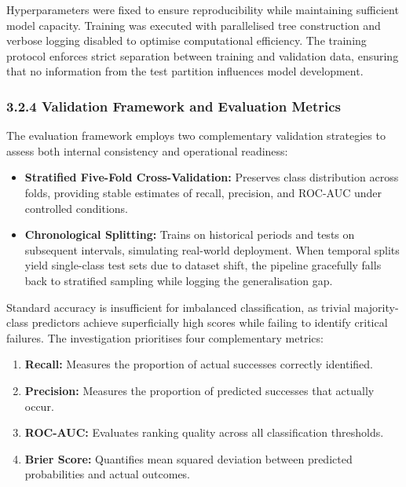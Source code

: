 Hyperparameters were fixed to ensure reproducibility while maintaining
sufficient model capacity. Training was executed with parallelised tree
construction and verbose logging disabled to optimise computational
efficiency. The training protocol enforces strict separation between
training and validation data, ensuring that no information from the test
partition influences model development.

\subsubsection{3.2.4 Validation Framework and Evaluation
Metrics}\label{validation-framework-and-evaluation-metrics}

The evaluation framework employs two complementary validation strategies
to assess both internal consistency and operational readiness:

\begin{itemize}
\tightlist
\item
  \textbf{Stratified Five-Fold Cross-Validation:} Preserves class
  distribution across folds, providing stable estimates of recall,
  precision, and ROC-AUC under controlled conditions.
\item
  \textbf{Chronological Splitting:} Trains on historical periods and
  tests on subsequent intervals, simulating real-world deployment. When
  temporal splits yield single-class test sets due to dataset shift, the
  pipeline gracefully falls back to stratified sampling while logging
  the generalisation gap.
\end{itemize}

Standard accuracy is insufficient for imbalanced classification, as
trivial majority-class predictors achieve superficially high scores
while failing to identify critical failures. The investigation
prioritises four complementary metrics:

\begin{enumerate}
\def\labelenumi{\arabic{enumi}.}
\tightlist
\item
  \textbf{Recall:} Measures the proportion of actual successes correctly
  identified.
\item
  \textbf{Precision:} Measures the proportion of predicted successes
  that actually occur.
\item
  \textbf{ROC-AUC:} Evaluates ranking quality across all classification
  thresholds.
\item
  \textbf{Brier Score:} Quantifies mean squared deviation between
  predicted probabilities and actual outcomes.
\end{enumerate}

